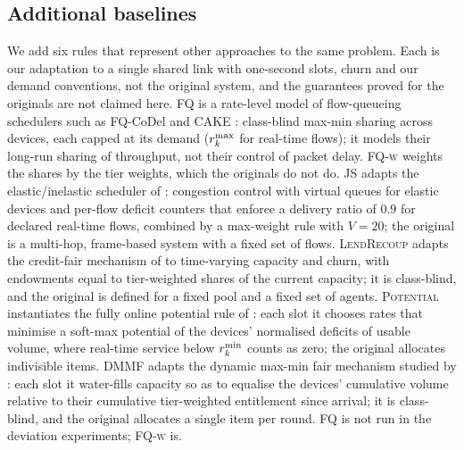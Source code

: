 \begin{table}[t]
\centering
\caption{Further trace-driven scenarios, load $1$, truthful devices (mean over six traces $\pm$ half-width of the 95\% interval).}
\label{tab:real2-compare}
\resizebox{\linewidth}{!}{}
\end{table}

\begin{table}[t]
\centering
\caption{Further trace-driven scenarios: one elastic device declares video for its whole stay ($120$ devices on six traces per scenario). Devices above bound: gain larger than $B_{g,\mathrm{v}}$ at the $V$ of the rule.}
\label{tab:real2-dev}
\resizebox{\linewidth}{!}{}
\end{table}

\subsection{Additional baselines}\label{sec:exp-baselines}

We add six rules that represent other approaches to the same problem. Each is our adaptation to a single shared link with one-second slots, churn and our demand conventions, not the original system, and the guarantees proved for the originals are not claimed here.
\textsc{FQ} is a rate-level model of flow-queueing schedulers such as FQ-CoDel \citep{rfc8290} and CAKE \citep{hoiland2018cake}: class-blind max-min sharing across devices, each capped at its demand ($r^{\max}_k$ for real-time flows); it models their long-run sharing of throughput, not their control of packet delay. \textsc{FQ-w} weights the shares by the tier weights, which the originals do not do.
\textsc{JS} adapts the elastic/inelastic scheduler of \citet{jaramillo2011elastic}: congestion control with virtual queues for elastic devices and per-flow deficit counters that enforce a delivery ratio of $0.9$ for declared real-time flows, combined by a max-weight rule with $V=20$; the original is a multi-hop, frame-based system with a fixed set of flows.
\textsc{LendRecoup} adapts the credit-fair mechanism of \citet{zahedi2026credit} to time-varying capacity and churn, with endowments equal to tier-weighted shares of the current capacity; it is class-blind, and the original is defined for a fixed pool and a fixed set of agents.
\textsc{Potential} instantiates the fully online potential rule of \citet{kahana2026perpetual}: each slot it chooses rates that minimise a soft-max potential of the devices' normalised deficits of usable volume, where real-time service below $r^{\min}_k$ counts as zero; the original allocates indivisible items.
\textsc{DMMF} adapts the dynamic max-min fair mechanism studied by \citet{fikioris2025dmmf}: each slot it water-fills capacity so as to equalise the devices' cumulative volume relative to their cumulative tier-weighted entitlement since arrival; it is class-blind, and the original allocates a single item per round.
\textsc{FQ} is not run in the deviation experiments; \textsc{FQ-w} is.

